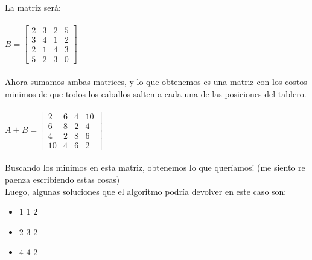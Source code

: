La matriz será:
\\
\\
$B = \begin{bmatrix}
      2 & 3 & 2 & 5  \\[0.3em]
      3 & 4 & 1 & 2  \\[0.3em]
      2 & 1 & 4 & 3  \\[0.3em]
      5 & 2 & 3 & 0
\end{bmatrix}$
\\
\\
Ahora sumamos ambas matrices, y lo que obtenemos es una matriz con los costos minimos de que todos los caballos salten a cada una de las posiciones del tablero.
\\
\\
$A + B =  \begin{bmatrix}
          2 & 6 & 4 & 10 \\[0.3em]
          6 & 8 & 2 & 4 \\[0.3em]
          4 & 2 & 8 & 6 \\[0.3em]
          10 & 4 & 6 & 2 
          \end{bmatrix}
          $
\\
\\
Buscando los minimos en esta matriz, obtenemos lo que quer\'iamos! (me siento re paenza escribiendo estas cosas)
\\
Luego, algunas soluciones que el algoritmo podr\'ia devolver en este caso son:
\\
\begin{itemize}
\item $1$ $1$ $2$ 
\item $2$ $3$ $2$
\item $4$ $4$ $2$ 
\end{itemize}

